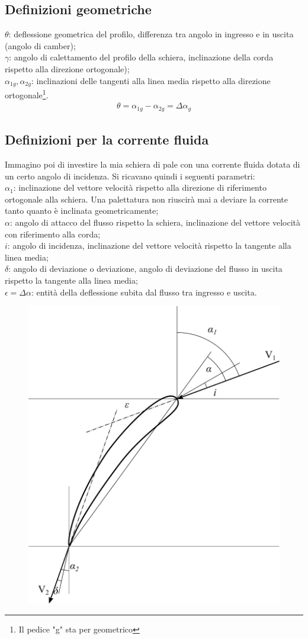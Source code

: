 \subsection{Definizioni geometriche}
$\theta$: deflessione geometrica del profilo, differenza tra angolo in ingresso e in uscita (angolo di camber);\\
$\gamma$: angolo di calettamento del profilo della schiera, inclinazione della corda rispetto alla direzione ortogonale);\\
$\alpha_{1g}, \alpha_{2g}$: inclinazioni delle tangenti alla linea media rispetto alla direzione ortogonale\footnote{Il pedice "g" sta per geometrico}.
\begin{align*}
\theta = \alpha_{1g} - \alpha_{2g} = \Delta \alpha_{g}
\end{align*}
\subsection{Definizioni per la corrente fluida}
Immagino poi di investire la mia schiera di pale con una corrente fluida dotata di un certo angolo di incidenza. Si ricavano quindi i seguenti parametri:\\[1mm]
$\alpha_1$: inclinazione del vettore velocità rispetto alla direzione di riferimento ortogonale alla schiera. Una palettatura non riuscirà mai a deviare la corrente tanto quanto è inclinata geometricamente;\\
$\alpha$: angolo di attacco del flusso rispetto la schiera, inclinazione del vettore velocità con riferimento alla corda;\\
$i$: angolo di incidenza, inclinazione del vettore velocità rispetto la tangente alla linea media;\\
$\delta$: angolo di deviazione o deviazione, angolo di deviazione del flusso in uscita rispetto la tangente alla linea media;\\
$\epsilon = \Delta \alpha$: entità della deflessione subita dal flusso tra ingresso e uscita.\\[2mm]
\begin{figure}
\centering
  \includegraphics[width=.45\textwidth]{fig/palasing.pdf}
\caption{}
\label{fig:palasing}
\end{figure}
